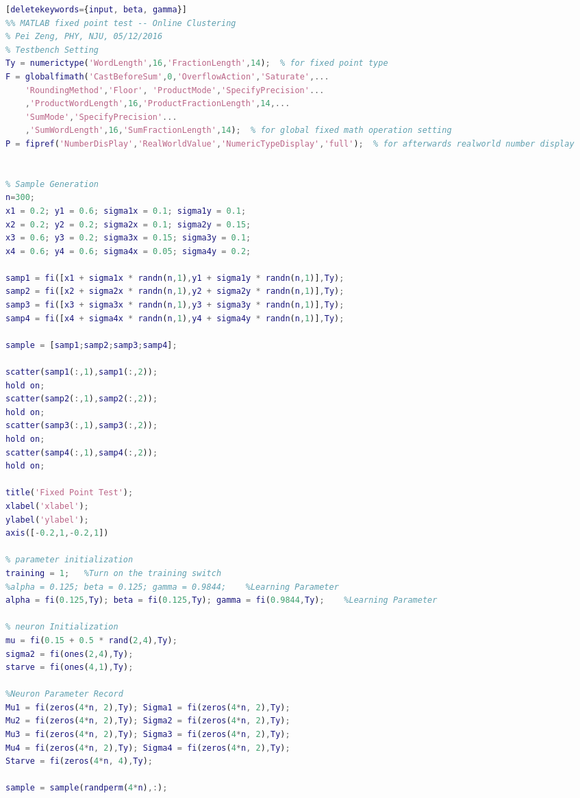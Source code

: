 \begin{spacing}{1}
\begin{lstlisting}[language=Matlab][deletekeywords={input, beta, gamma}]
%% MATLAB fixed point test -- Online Clustering
% Pei Zeng, PHY, NJU, 05/12/2016
% Testbench Setting
Ty = numerictype('WordLength',16,'FractionLength',14);  % for fixed point type
F = globalfimath('CastBeforeSum',0,'OverflowAction','Saturate',...
    'RoundingMethod','Floor', 'ProductMode','SpecifyPrecision'...    
    ,'ProductWordLength',16,'ProductFractionLength',14,... 
    'SumMode','SpecifyPrecision'...    
    ,'SumWordLength',16,'SumFractionLength',14);  % for global fixed math operation setting
P = fipref('NumberDisPlay','RealWorldValue','NumericTypeDisplay','full');  % for afterwards realworld number display


% Sample Generation
n=300;
x1 = 0.2; y1 = 0.6; sigma1x = 0.1; sigma1y = 0.1;
x2 = 0.2; y2 = 0.2; sigma2x = 0.1; sigma2y = 0.15;
x3 = 0.6; y3 = 0.2; sigma3x = 0.15; sigma3y = 0.1;
x4 = 0.6; y4 = 0.6; sigma4x = 0.05; sigma4y = 0.2;

samp1 = fi([x1 + sigma1x * randn(n,1),y1 + sigma1y * randn(n,1)],Ty);
samp2 = fi([x2 + sigma2x * randn(n,1),y2 + sigma2y * randn(n,1)],Ty);
samp3 = fi([x3 + sigma3x * randn(n,1),y3 + sigma3y * randn(n,1)],Ty);
samp4 = fi([x4 + sigma4x * randn(n,1),y4 + sigma4y * randn(n,1)],Ty);

sample = [samp1;samp2;samp3;samp4];

scatter(samp1(:,1),samp1(:,2));
hold on;
scatter(samp2(:,1),samp2(:,2));
hold on;
scatter(samp3(:,1),samp3(:,2));
hold on;
scatter(samp4(:,1),samp4(:,2));
hold on;

title('Fixed Point Test');
xlabel('xlabel');
ylabel('ylabel');
axis([-0.2,1,-0.2,1])

% parameter initialization
training = 1;   %Turn on the training switch
%alpha = 0.125; beta = 0.125; gamma = 0.9844;    %Learning Parameter
alpha = fi(0.125,Ty); beta = fi(0.125,Ty); gamma = fi(0.9844,Ty);    %Learning Parameter

% neuron Initialization
mu = fi(0.15 + 0.5 * rand(2,4),Ty);
sigma2 = fi(ones(2,4),Ty);
starve = fi(ones(4,1),Ty);

%Neuron Parameter Record
Mu1 = fi(zeros(4*n, 2),Ty); Sigma1 = fi(zeros(4*n, 2),Ty);
Mu2 = fi(zeros(4*n, 2),Ty); Sigma2 = fi(zeros(4*n, 2),Ty);
Mu3 = fi(zeros(4*n, 2),Ty); Sigma3 = fi(zeros(4*n, 2),Ty);
Mu4 = fi(zeros(4*n, 2),Ty); Sigma4 = fi(zeros(4*n, 2),Ty);
Starve = fi(zeros(4*n, 4),Ty);

sample = sample(randperm(4*n),:);


\end{lstlisting}
\end{spacing}

